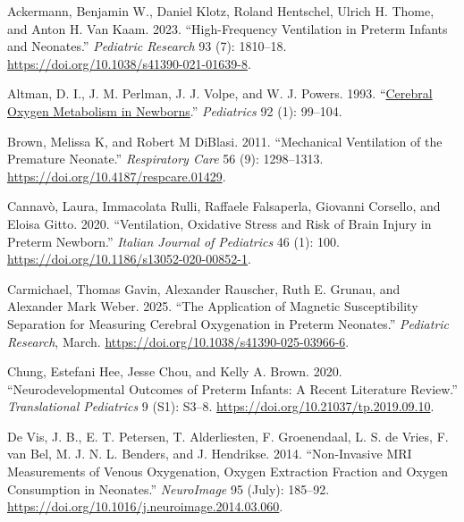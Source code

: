 \documentclass[
  letterpaper,
  DIV=11,
  numbers=noendperiod]{scrartcl}
\newlength{\cslhangindent}
\newenvironment{CSLReferences}[2] %
 {\begin{list}{}{%
  \setlength{\itemindent}{0pt}
  \setlength{\leftmargin}{0pt}
  \setlength{\parsep}{0pt}
  \ifodd #1
   \setlength{\leftmargin}{\cslhangindent}
   \setlength{\itemindent}{-1\cslhangindent}
  \fi
  \setlength{\itemsep}{#2\baselineskip}}}
 {\end{list}}
\begin{document}
\label{refs}
\begin{CSLReferences}{1}{0}
Ackermann, Benjamin W., Daniel Klotz, Roland Hentschel, Ulrich H. Thome,
and Anton H. Van Kaam. 2023. {``High-Frequency Ventilation in Preterm
Infants and Neonates.''} \emph{Pediatric Research} 93 (7): 1810--18.
\url{https://doi.org/10.1038/s41390-021-01639-8}.

Altman, D. I., J. M. Perlman, J. J. Volpe, and W. J. Powers. 1993.
{``\href{https://www.ncbi.nlm.nih.gov/pubmed/8516092}{Cerebral Oxygen
Metabolism in Newborns}.''} \emph{Pediatrics} 92 (1): 99--104.

Brown, Melissa K, and Robert M DiBlasi. 2011. {``Mechanical
{Ventilation} of the {Premature Neonate}.''} \emph{Respiratory Care} 56
(9): 1298--1313. \url{https://doi.org/10.4187/respcare.01429}.

Cannavò, Laura, Immacolata Rulli, Raffaele Falsaperla, Giovanni
Corsello, and Eloisa Gitto. 2020. {``Ventilation, Oxidative Stress and
Risk of Brain Injury in Preterm Newborn.''} \emph{Italian Journal of
Pediatrics} 46 (1): 100.
\url{https://doi.org/10.1186/s13052-020-00852-1}.

Carmichael, Thomas Gavin, Alexander Rauscher, Ruth E. Grunau, and
Alexander Mark Weber. 2025. {``The Application of Magnetic
Susceptibility Separation for Measuring Cerebral Oxygenation in Preterm
Neonates.''} \emph{Pediatric Research}, March.
\url{https://doi.org/10.1038/s41390-025-03966-6}.

Chung, Estefani Hee, Jesse Chou, and Kelly A. Brown. 2020.
{``Neurodevelopmental Outcomes of Preterm Infants: A Recent Literature
Review.''} \emph{Translational Pediatrics} 9 (S1): S3--8.
\url{https://doi.org/10.21037/tp.2019.09.10}.

De Vis, J. B., E. T. Petersen, T. Alderliesten, F. Groenendaal, L. S. de
Vries, F. van Bel, M. J. N. L. Benders, and J. Hendrikse. 2014.
{``Non-Invasive {MRI} Measurements of Venous Oxygenation, Oxygen
Extraction Fraction and Oxygen Consumption in Neonates.''}
\emph{NeuroImage} 95 (July): 185--92.
\url{https://doi.org/10.1016/j.neuroimage.2014.03.060}.


\end{CSLReferences}
\end{document}
